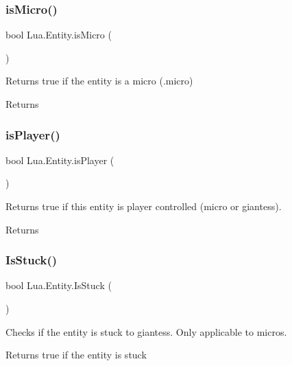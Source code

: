 \subsubsection{\texorpdfstring{isMicro()}{isMicro()}}
{\footnotesize\ttfamily bool Lua.\+Entity.\+is\+Micro (\begin{DoxyParamCaption}{ }\end{DoxyParamCaption})}



Returns true if the entity is a micro (.micro) 

\begin{DoxyReturn}{Returns}

\end{DoxyReturn}
\mbox{\label{class_lua_1_1_entity_af7b9099c16b719f42e4fdfd82661d259}} 
\subsubsection{\texorpdfstring{isPlayer()}{isPlayer()}}
{\footnotesize\ttfamily bool Lua.\+Entity.\+is\+Player (\begin{DoxyParamCaption}{ }\end{DoxyParamCaption})}



Returns true if this entity is player controlled (micro or giantess). 

\begin{DoxyReturn}{Returns}

\end{DoxyReturn}
\mbox{\label{class_lua_1_1_entity_ab25d357d357ab0cf7ff9a2e81aa9cb08}} 
\subsubsection{\texorpdfstring{IsStuck()}{IsStuck()}}
{\footnotesize\ttfamily bool Lua.\+Entity.\+Is\+Stuck (\begin{DoxyParamCaption}{ }\end{DoxyParamCaption})}



Checks if the entity is stuck to giantess. Only applicable to micros. 

\begin{DoxyReturn}{Returns}
true if the entity is stuck
\end{DoxyReturn}
\mbox{\label{class_lua_1_1_entity_aa8688dacb32db168b780597d8f11622b}} 
